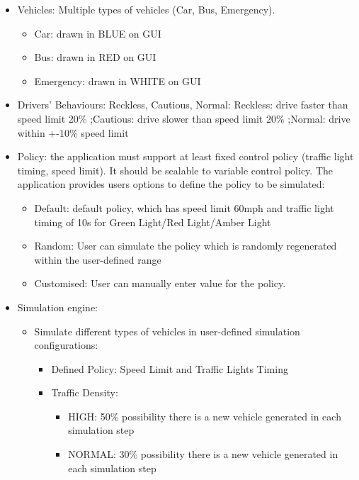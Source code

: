 \documentclass[11pt]{article}
\begin{document}
{\begin{itemize}
\begin{itemize}
\begin{itemize}[noitemsep]
	
    	\end{itemize}

        \item Vehicles: Multiple types of vehicles (Car, Bus, Emergency). 
            \begin{itemize}
                \item Car: drawn in BLUE on GUI
                \item Bus: drawn in RED on GUI
                \item Emergency: drawn in WHITE on GUI
            \end{itemize}
       
        
        \item Drivers' Behaviours: Reckless, Cautious, Normal:
        Reckless: drive faster than speed limit 20\%
        ;Cautious: drive slower than speed limit 20\%
        ;Normal: drive within +-10\% speed limit
        
        \item Policy: the application must support at least fixed control policy (traffic light timing, speed limit). It should be scalable to variable control policy. The application provides users options to define the policy to be simulated:
            \begin{itemize}
                \item Default: default policy, which has speed limit 60mph and traffic light timing of 10s for Green Light/Red Light/Amber Light
                \item Random: User can simulate the policy which is randomly regenerated within the user-defined range
                \item Customised: User can manually enter value for the policy.
            \end{itemize}

        \item Simulation engine: 
        \begin{itemize}
        
        \item Simulate different types of vehicles in user-defined simulation configurations:
            \begin{itemize}
            \item Defined Policy: Speed Limit and Traffic Lights Timing
            \item Traffic Density:
                \begin{itemize}
                \item HIGH: 50\% possibility there is a new vehicle generated in each simulation step
                 \item NORMAL: 30\% possibility there is a new vehicle generated in each simulation step
                

\end{itemize}
\end{itemize}
\end{itemize}
\end{itemize}
\end{itemize}}
\end{document}
